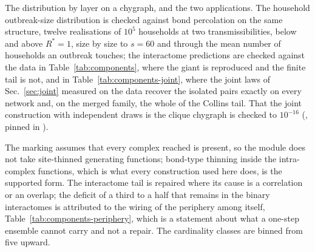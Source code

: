 The distribution by layer on a chygraph, and the two applications. The
household outbreak-size distribution is checked against bond percolation
on the same structure, twelve realisations of $10^{5}$ households at two
transmissibilities, below and above $R^{*}=1$, size by size to $s=60$ and
through the mean number of households an outbreak touches; the interactome
predictions are checked against the data in Table~\ref{tab:components},
where the giant is reproduced and the finite tail is not, and in
Table~\ref{tab:components-joint}, where the joint laws of
Sec.~\ref{sec:joint} measured on the data recover the isolated pairs
exactly on every network and, on the merged family, the whole of the
Collins tail. That the joint construction with independent draws is the
clique chygraph is checked to $10^{-16}$
(, pinned in
).

The marking assumes that every complex reached is present, so the module
does not take site-thinned generating functions; bond-type thinning inside
the intra-complex functions, which is what every construction used here
does, is the supported form. The interactome tail is repaired where
its cause is a correlation or an overlap; the deficit of a third to a half
that remains in the binary interactomes is attributed to the wiring of the
periphery among itself, Table~\ref{tab:components-periphery}, which is a
statement about what a one-step ensemble cannot carry and not a repair.
The cardinality classes are binned from five upward.
